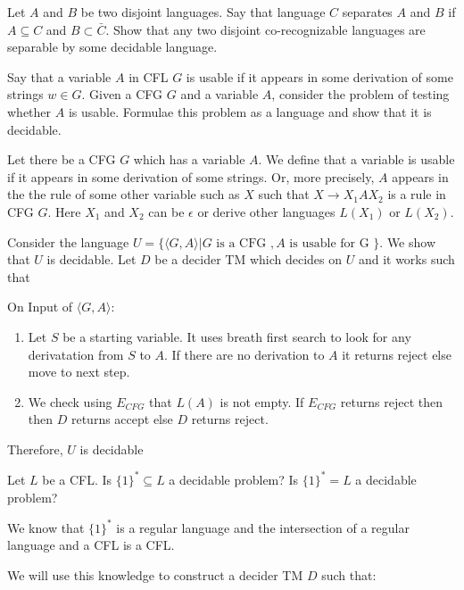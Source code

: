 \documentclass[12pt]{exam}
\begin{document}
\begin{questions}
  \question{} %
  Let $A$ and $B$ be two disjoint languages. Say that language $C$ separates $A$ and $B$ if $A\subseteq C$ and $B\subset \bar C$. Show that any two disjoint co-recognizable languages are separable by some decidable language.


  \question{} %
  Say that a variable $A$ in CFL $G$ is usable if it appears in some derivation of some strings $w\in G$. Given a CFG $G$ and a variable $A$, consider the problem of testing whether $A$ is usable.
  Formulae this problem as a language and show that it is decidable.

  \begin{solution}
    Let there be a CFG $G$ which has a variable $A$. We define that a variable is usable if it appears in some derivation of some strings. Or, more precisely, $A$ appears in the the rule of some other variable such as $X$ such that $X\to X_{1}AX_{2}$ is a rule in CFG $G$.
    Here $X_{1}$ and $X_{2}$ can be $\epsilon$ or derive other languages $L(X_{1})$ or $L(X_{2})$.

    Consider the language $U = \{\langle G,A\rangle| G \text{ is a CFG }, A \text{ is usable for G }\}$. We show that $U$ is decidable.
    Let $D$ be a decider TM which decides on $U$ and it works such that

    On Input of $\langle G,A\rangle$:
    \begin{enumerate}
      \item Let $S$ be a starting variable. It uses breath first search to look for any derivatation from $S$ to $A$. If there are no derivation to $A$ it returns reject else move to next step.
      \item We check using $E_{CFG}$ that $L(A)$ is not empty. If $E_{CFG}$ returns reject then then $D$ returns accept else $D$ returns reject.
    \end{enumerate}

    Therefore, $U$ is decidable

  \end{solution}

  \question{} %
  Let $L$ be a CFL. Is $\{1\}^{*}\subseteq L$ a decidable problem?
  Is $\{1\}^{*}=L$ a decidable problem?

  \begin{solution}
    We know that $\{1\}^{*}$ is a regular language and the intersection of a regular language and a CFL is a CFL.

    We will use this knowledge to construct a decider TM $D$ such that:


\end{solution}
\end{questions}
\end{document}
